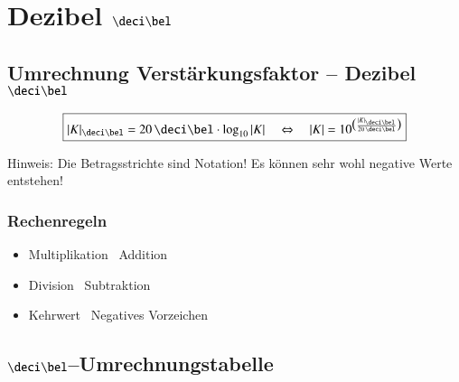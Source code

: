 \section{Dezibel $\deci \bel$}


\subsection{Umrechnung Verstärkungsfaktor -- Dezibel $\deci \bel$}

$$ \boxed{ |K|_{\deci \bel} = 20 \, \deci \bel \cdot \log_{10} |K| \quad \Leftrightarrow \quad 
            |K| = 10 ^{\big( \frac{|K|_{\deci \bel}}{20 \, \deci \bel}\big)}  } $$

Hinweis: Die Betragsstrichte sind Notation! Es können sehr wohl negative Werte entstehen!

\subsubsection{Rechenregeln}

\begin{itemize}
    \item Multiplikation \textrightarrow\ Addition
    \item Division \textrightarrow\ Subtraktion
    \item Kehrwert \textrightarrow\ Negatives Vorzeichen
\end{itemize}


\subsection{$\deci \bel$--Umrechnungstabelle}

